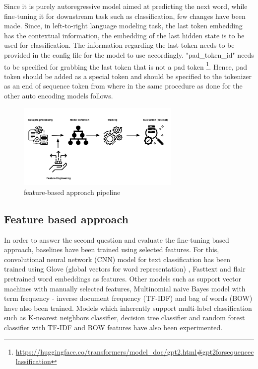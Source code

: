 Since it is purely autoregressive model aimed at predicting the next word, while fine-tuning it for downstream task such as classification, few changes have been made. Since, in left-to-right language modeling task, the last token embedding has the contextual information, the embedding of the last hidden state is to be used for classification. The information regarding the last token needs to be provided in the config file for the model to use accordingly. "pad\_token\_id" needs to be specified for grabbing the last token that is not a pad token \footnote{\url{https://huggingface.co/transformers/model_doc/gpt2.html#gpt2forsequenceclassification}}. Hence, pad token should be added as a special token and should be specified to the tokenizer as an end of sequence token from where in the same procedure as done for the other auto encoding models follows.

\begin{figure}[]
    \centering
    \includegraphics[width=0.7\textwidth]{thesis/Baseline_pipeline.png}
    \caption{feature-based approach pipeline}
    \label{fig:feature-based approach pipeline}
\end{figure}

\subsection{Feature based approach}
In order to answer the second question and evaluate the fine-tuning based approach, baselines have been trained using selected features. For this, convolutional neural network (CNN) model for text classification has been trained using Glove (global vectors for word representation) \cite{pennington2014glove}, Fasttext  \cite{joulin2017bag} and flair  \cite{akbik2019flair} pretrained word embeddings as features. Other models such as support vector machines with manually selected features, Multinomial naive Bayes model with term frequency - inverse document frequency (TF-IDF) and bag of words (BOW) have also been trained. Models which inherently support multi-label classification such as K-nearest neighbors classifier, decision tree classifier and random forest classifier with TF-IDF and BOW features have also been experimented.

